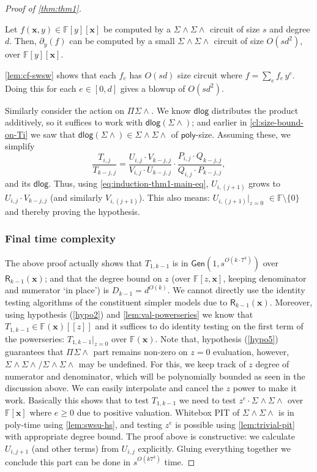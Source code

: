\documentclass[10pt,a4paper]{article}
\newcommand{\poly}{\mathsf{poly}}
\newcommand{\F}{\mathbb{F}}
\newcommand{\ringR}{\mathsf{R}}
\newcommand{\x}{{\boldsymbol x}}
\newcommand{\dlg}{\mathsf{dlog}}
\newcommand{\PSU}[2]{\Pi^{#1} \Sigma\wedge^{#2}}
\newcommand{\SWSU}[2]{\Sigma^{#1}\!\wedge\!\Sigma\!\wedge^{#2}}
\newcommand{\Gen}[2]{\mathsf{Gen}(#1,#2)}
\numberwithin{equation}{section}
\newenvironment{proof-sketch}{\medskip\noindent{\em Proof Sketch.}}{\qed\bigskip}
\begin{document}
\begin{proof}[Proof of \autoref{thm:thm1}]
\begin{lemma}[Differentiation] \label{lem:diff-size}
    Let $f(\x,y) \in \F[y][\x]$ be computed by a $\SWSU{}{}$ circuit of size $s$ and degree $d$. Then, $\partial_{y}(f)$ can be computed by a small $\SWSU{}{}$ circuit of size $O(sd^2)$, over $\F[y][\x]$.
\end{lemma}
\begin{proof-sketch}
    \autoref{lem:cf-swsw} shows that each $f_e$ has $O(sd)$ size circuit where $f=\sum_{e} f_e\,y^e$. 
    Doing this for each $e \in [0,d]$ gives a blowup of $O(sd^2)$.
\end{proof-sketch}

Similarly consider the action on $ \PSU{}{}$. We know $\dlg$ distributes the product additively, so it suffices to work with $\dlg(\Sigma \wedge)$; and earlier in \autoref{cl:size-bound-on-Ti} we saw that $\dlg(\Sigma \wedge) \in \SWSU{}{}{}$ of $\poly$-size. Assuming these, we simplify \[ \frac{T_{i,j}}{T_{k-j,j}} = \frac{U_{i,j} \cdot V_{k-j,j}}{V_{i,j} \cdot U_{k-j,j}} \cdot \frac{P_{i,j} \cdot Q_{k-j,j}}{Q_{i,j} \cdot P_{k-j,j}},\] and its $\dlg$. Thus, using \autoref{eq:induction-thm1-main-eq}, $U_{i,(j+1)}$ grows to $U_{i,j} \cdot V_{k-j,j}$ (and similarly $V_{i,(j+1)}$). This also means: $U_{i,(j+1)} \rvert_{z=0}$ $\in \F\setminus\{0\}$ and thereby proving the hypothesis.


\subsubsection*{Final time complexity} 
The above proof actually shows that $T_{1,k-1}$ is in $\Gen{1}{s^{O(k\cdot 7^k)}}$ over $\ringR_{k-1}(\x)$; and that the degree bound on $z$ (over $\F[z,\x]$, keeping denominator and numerator `in place') is $D_{k-1} = d^{O(k)}$. We cannot directly use the identity testing algorithms of the constituent simpler models due to $\ringR_{k-1}(\x)$. Moreover, using hypothesis (\ref{hypo2}) and \autoref{lem:val-powerseries} we know that $T_{1,k-1} \in \F(\x)[[z]]$ and it suffices to do identity testing on the first term of the powerseries: $T_{1,k-1} \rvert_{z = 0}$ over $\F(\x)$. Note that, hypothesis (\ref{hypo5}) guarantees that $\PSU{}{}$ part remains non-zero on $z = 0$ evaluation, however, $\SWSU{}{}/\SWSU{}{}$ may be undefined. For this, we keep track of $z$ degree of numerator and denominator, which will be polynomially bounded as seen in the discussion above. We can easily interpolate and cancel the $z$ power to make it work. Basically this shows that to test $T_{1,k-1}$ we need to test $z^e \cdot \SWSU{}{}$ over $\F[\x]$ where $e \geq 0$ due to positive valuation. Whitebox PIT of $\SWSU{}{}$ is in poly-time using \autoref{lem:swsu-hs}, and testing $z^e$ is possible using \autoref{lem:trivial-pit} with appropriate degree bound. The proof above is constructive: we calculate $U_{i,j+1}$ (and other terms) from $U_{i,j}$ explicitly. Gluing everything together we conclude this part can be done in $s^{O(k 7^k)}$ time.


\end{proof}
\end{document}
